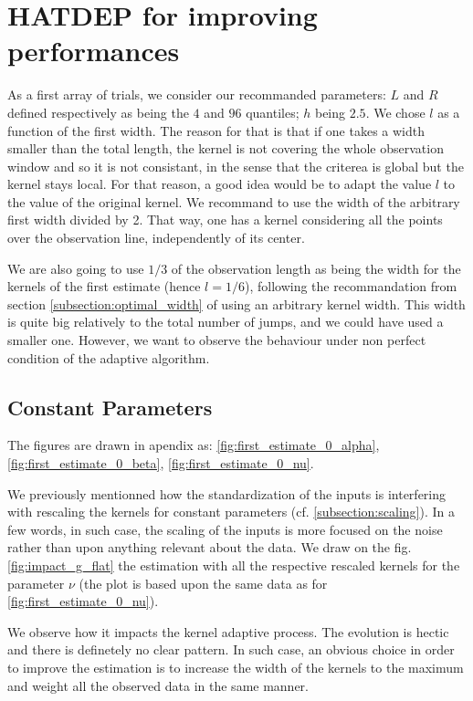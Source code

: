 \documentclass[11pt]{book}
\begin{document}
\section{HATDEP for improving performances}
\label{section_first_simul}
As a first array of trials, we consider our recommanded parameters: $L$ and $R$ defined respectively as being the $4$ and $96$ quantiles; $h$ being $2.5$. We chose $l$ as a function of the first width. The reason for that is that if one takes a width smaller than the total length, the kernel is not covering the whole observation window and so it is not consistant, in the sense that the criterea is global but the kernel stays local. For that reason, a good idea would be to adapt the value $l$ to the value of the original kernel. We recommand to use the width of the arbitrary first width divided by 2. That way, one has a kernel considering all the points over the observation line, independently of its center.


We are also going to use $1/3$ of the observation length as being the width for the kernels of the first estimate (hence $l = 1/6$), following the recommandation from section \ref{subsection:optimal_width} of using an arbitrary kernel width. This width is quite big relatively to the total number of jumps, and we could have used a smaller one. However, we want to observe the behaviour under non perfect condition of the adaptive algorithm.



\subsection{Constant Parameters}
The figures are drawn in apendix as: \ref{fig:first_estimate_0_alpha}, \ref{fig:first_estimate_0_beta}, \ref{fig:first_estimate_0_nu}. 


We previously mentionned how the standardization of the inputs is interfering with rescaling the kernels for constant parameters (cf. \ref{subsection:scaling}). In a few words, in such case, the scaling of the inputs is more focused on the noise rather than upon anything relevant about the data. We draw on the fig. \ref{fig:impact_g_flat} the estimation with all the respective rescaled kernels for the parameter $\nu$ (the plot is based upon the same data as for \ref{fig:first_estimate_0_nu}). 

We observe how it impacts the kernel adaptive process. The evolution is hectic and there is definetely no clear pattern. In such case, an obvious choice in order to improve the estimation is to increase the width of the kernels to the maximum and weight all the observed data in the same manner. 
\end{document}

